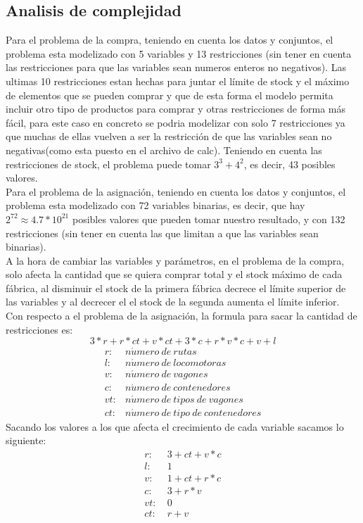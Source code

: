 \documentclass[11pt,spanish]{article}
\begin{document}
		\subsection{Analisis de complejidad}
		Para el problema de la compra, teniendo en cuenta los datos y conjuntos, el problema esta modelizado con 5 variables y 13 restricciones (sin tener en cuenta las restricciones para que las variables sean numeros enteros no negativos). Las ultimas 10 restricciones estan hechas para juntar el límite de stock y el máximo de elementos que se pueden comprar y que de esta forma el modelo permita incluir otro tipo de productos para comprar y otras restricciones de forma más fácil, para este caso en concreto se podria modelizar con solo 7 restricciones ya que muchas de ellas vuelven a ser la restricción de que las variables sean no negativas(como esta puesto en el archivo de calc). Teniendo en cuenta las restricciones de stock, el problema puede tomar $3^3+4^2$, es decir, 43 posibles valores.\\
		Para el problema de la asignación, teniendo en cuenta los datos y conjuntos, el problema esta modelizado con 72 variables binarias, es decir, que hay $2^{72}\approx4.7*10^{21}$ posibles valores que pueden tomar nuestro resultado, y con 132 restricciones (sin tener en cuenta las que limitan a que las variables sean binarias).\\
		A la hora de cambiar las variables y parámetros, en el problema de la compra, solo afecta la cantidad que se quiera comprar total y el stock máximo de cada fábrica, al disminuir el stock de la primera fábrica decrece el límite superior de las variables y al decrecer el el stock de la segunda aumenta el límite inferior. Con respecto a el problema de la asignación, la formula para sacar la cantidad de restricciones es: 
		$$
		3*r+r*ct+v*ct+3*c+r*v*c+v+l
		$$
		\begin{align*}
			r:& n\acute{u}mero\ de\ rutas\\
			l:& n\acute{u}mero\ de\ locomotoras\\
			v:& n\acute{u}mero\ de\ vagones\\
			c:& n\acute{u}mero\ de\ contenedores\\
			vt:& n\acute{u}mero\ de\ tipos\ de\ vagones\\
			ct:& n\acute{u}mero\ de\ tipo\ de\ contenedores
		\end{align*}
		Sacando los valores a los que afecta el crecimiento de cada variable sacamos lo siguiente:
		\begin{align*}
			r:&\ 3+ct+v*c\\
			l:&\ 1\\
			v:&\ 1+ct+r*c\\
			c:&\ 3+r*v\\
			vt:&\ 0\\
			ct:&\ r+v
		\end{align*}
\end{document}
